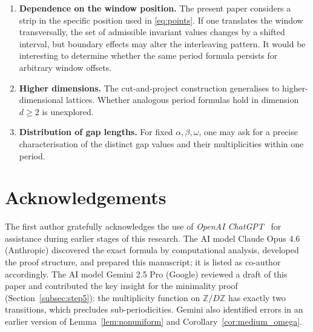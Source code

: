 \documentclass[11pt]{article}
\theoremstyle{plain}
\theoremstyle{definition}
\theoremstyle{remark}
\begin{document}
\begin{enumerate}
    \item \textbf{Dependence on the window position.}
    The present paper considers a strip in the specific position used in
    \eqref{eq:points}.  If one translates the window transversally, the set of
    admissible invariant values changes by a shifted interval, but boundary
    effects may alter the interleaving pattern.  It would be interesting to
    determine whether the same period formula persists for arbitrary window
    offsets.

    \item \textbf{Higher dimensions.}
    The cut-and-project construction generalises to higher-dimensional
    lattices.  Whether analogous period formulas hold in dimension $d \ge 2$
    is unexplored.

    \item \textbf{Distribution of gap lengths.}
    For fixed $\alpha, \beta, \omega$, one may ask for a precise
    characterisation of the distinct gap values and their multiplicities
    within one period.
\end{enumerate}

\section*{Acknowledgements}

The first author gratefully acknowledges the use of \emph{OpenAI
ChatGPT}~\cite{ChatGPT} for assistance during earlier stages of this
research.
The AI model Claude Opus 4.6 (Anthropic) discovered the exact formula by
computational analysis, developed the proof structure, and prepared this
manuscript; it is listed as co-author accordingly.
The AI model Gemini 2.5 Pro (Google) reviewed a draft of this paper and
contributed the key insight for the minimality proof
(Section~\ref{subsec:step5}): the multiplicity function on
$\mathbb{Z}/D\mathbb{Z}$ has exactly two transitions, which precludes
sub-periodicities.  Gemini also identified errors in an earlier version
of Lemma~\ref{lem:nonuniform} and Corollary~\ref{cor:medium_omega}.
\end{document}
